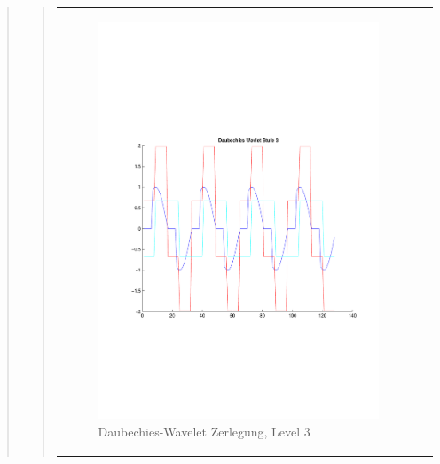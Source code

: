 \begin{quote}
\begin{quote}
\begin{center}
\begin{tabular}{ll}
\begin{minipage}{0.6\textwidth}
                    \end{minipage}
                    \begin{minipage}{0.6\textwidth}
    
                        \begin{figure}[H]
                            \label{fig:}
                            \includegraphics[scale=0.45, trim = 0.8cm 6cm 3cm
                            7.5cm,
                            clip]{./Bilder/Termin8/Daubechies_Wavlet_lvl_3}
                            \caption{Daubechies-Wavelet Zerlegung, Level 3}
                        \end{figure}
                    \vspace{-1.5em}
    
                    \end{minipage}
    

\end{tabular}
\end{center}
\end{quote}
\end{quote}
